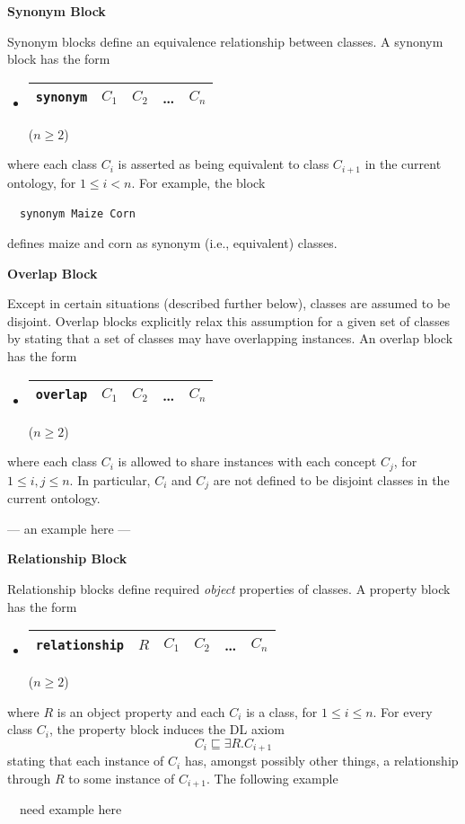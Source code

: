 \documentclass[preprint,number]{elsarticle}
\newcommand{\mypara}[1]{\vspace{12pt}\noindent\textbf{#1}}
\begin{document}
\mypara{Synonym Block}

\mypara{}Synonym blocks define an equivalence relationship between
classes.  A synonym block has the form
\begin{itemize}
\item[] 
  \begin{tabular}{|l|l|l|l|l|}\hline
    \texttt{synonym} & $C_1$ & $C_2$ & \dots & $C_n$ \\ \hline 
  \end{tabular} \hfill ($n \ge 2$)
\end{itemize}
where each class $C_i$ is asserted as being equivalent to class
$C_{i+1}$ in the current ontology, for $1 \le i < n$. For example, the
block
\begin{tabbing}
~~\texttt{synonym Maize Corn}
\end{tabbing}
defines maize and corn as synonym (i.e., equivalent) classes.


\mypara{Overlap Block} 

\mypara{}Except in certain situations (described further below),
classes are assumed to be disjoint.  Overlap blocks explicitly relax
this assumption for a given set of classes by stating that a set of
classes may have overlapping instances. An overlap block has the form
\begin{itemize}
\item[] 
  \begin{tabular}{|l|l|l|l|l|}\hline
    \texttt{overlap} & $C_1$ & $C_2$ & \dots & $C_n$ \\ \hline 
  \end{tabular} \hfill ($n \ge 2$)
\end{itemize}
where each class $C_i$ is allowed to share instances with each concept
$C_j$, for $1 \le i,j \le n$. In particular, $C_i$ and $C_j$ are not
defined to be disjoint classes in the current ontology. 

--- an example here ---


\mypara{Relationship Block}

\mypara{}Relationship blocks define required \emph{object} properties
of classes. A property block has the form
\begin{itemize}
\item[]
  \begin{tabular}{|l|l|l|l|l|l|}\hline \texttt{relationship} & $R$ & $C_1$
    & $C_2$ & \dots & $C_n$ \\ \hline
  \end{tabular} \hfill ($n \ge 2$)
\end{itemize}
where $R$ is an object property and each $C_i$ is a class, for $1 \le
i \le n$.  For every class $C_i$, the property block induces the DL
axiom \[C_i \sqsubseteq \exists R . C_{i+1} \] stating that each
instance of $C_i$ has, amongst possibly other things, a relationship
through $R$ to some instance of $C_{i+1}$.  The following example
\begin{tabbing}
   ~~need example here
\end{tabbing}
\end{document}
